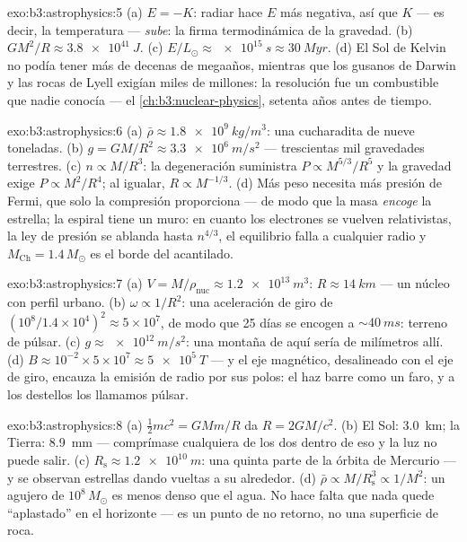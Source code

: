 \begin{solution}{exo:b3:astrophysics:5}
(a) $E = -K$: radiar hace $E$ más negativa, así que $K$ ---
es decir, la temperatura --- \emph{sube}: la firma termodinámica
de la gravedad. (b) $GM^2/R \approx \qty{3.8e41}{J}$. (c)
$E/L_\odot \approx \qty{e15}{s} \approx \qty{30}{Myr}$. (d)
El Sol de Kelvin no podía tener más de decenas de megaaños, mientras que
los gusanos de Darwin y las rocas de Lyell exigían miles de millones: la
resolución fue un combustible que nadie conocía --- el \cref{ch:b3:nuclear-physics},
setenta años antes de tiempo.
\end{solution}

\begin{solution}{exo:b3:astrophysics:6}
(a) $\bar\rho \approx \qty{1.8e9}{kg/m^3}$: una cucharadita de nueve
toneladas. (b) $g = GM/R^2 \approx \qty{3.3e6}{m/s^2}$ --- trescientas
mil gravedades terrestres. (c) $n \propto M/R^3$: la
degeneración suministra $P \propto M^{5/3}/R^5$ y la gravedad exige
$P \propto M^2/R^4$; al igualar, $R \propto M^{-1/3}$. (d) Más
peso necesita más presión de Fermi, que solo la compresión
proporciona --- de modo que la masa \emph{encoge} la estrella; la espiral tiene un
muro: en cuanto los electrones se vuelven relativistas, la ley de presión se ablanda hasta
$n^{4/3}$, el equilibrio falla a cualquier radio y
$M_{\text{Ch}} = 1.4\,M_\odot$ es el borde del acantilado.
\end{solution}

\begin{solution}{exo:b3:astrophysics:7}
(a) $V = M/\rho_{\text{nuc}} \approx \qty{1.2e13}{m^3}$:
$R \approx \qty{14}{km}$ --- un núcleo con perfil urbano. (b)
$\omega \propto 1/R^2$: una aceleración de giro de $(10^8/1.4\times10^4)^2
\approx 5\times10^{7}$, de modo que 25 días se encogen a
${\sim}\qty{40}{ms}$: terreno de púlsar. (c) $g \approx
\qty{e12}{m/s^2}$: una montaña de aquí sería de milímetros allí.
(d) $B \approx 10^{-2}\times5\times10^{7} \approx
\qty{5e5}{T}$ --- y el eje magnético, desalineado con el
eje de giro, encauza la emisión de radio por sus polos: el haz
barre como un faro, y a los destellos los llamamos púlsar.
\end{solution}

\begin{solution}{exo:b3:astrophysics:8}
(a) $\tfrac12mc^2 = GMm/R$ da $R = 2GM/c^2$. (b) El Sol:
\qty{3.0}{km}; la Tierra: \qty{8.9}{mm} --- comprímase cualquiera de los dos dentro
de eso y la luz no puede salir. (c) $R_{\text{s}} \approx
\qty{1.2e10}{m}$: una quinta parte de la órbita de Mercurio --- y se observan
estrellas dando vueltas a su alrededor. (d) $\bar\rho \propto
M/R_{\text{s}}^3 \propto 1/M^2$: un agujero de $10^8\,M_\odot$ es menos
denso que el agua. No hace falta que nada quede ``aplastado'' en el horizonte ---
es un punto de no retorno, no una superficie de roca.
\end{solution}


